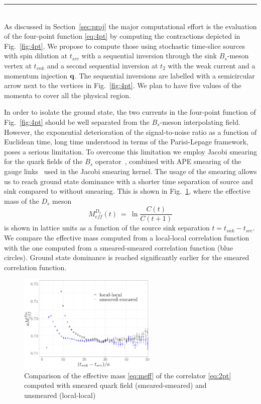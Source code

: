 \label{sec:algos}
\rule{\textwidth}{0.4pt}\\

As discussed in Section~\ref{sec:proj} the major computational effort is 
the evaluation of the four-point function \eqref{eq:4pt} by computing the
contractions depicted in Fig.~\ref{fig:4pt}.
We propose to compute those using stochastic time-slice sources with
spin dilution at $t_{src}$ with a sequential inversion through the
sink $B_s$-meson vertex at $t_{snk}$ and a second sequential inversion
at $t_2$ with the weak current and a momentum injection ${\bf q}$.
The sequential inversions are labelled with a semicircular arrow next to
the vertices in Fig.~\ref{fig:4pt}. We plan to have five values of the
momenta to cover all the physical region.

In order to isolate the ground state, the two currents in the
four-point function of Fig.~\ref{fig:4pt} should be well separated
from the $B_s$-meson interpolating field. However, the exponential
deterioration of the signal-to-noise ratio as a function of Euclidean
time, long time understood in terms of the Parisi-Lepage framework,
poses a serious limitation. To overcome this limitation we employ
Jacobi smearing for the quark fields of the $B_s$
operator~\cite{Allton:1993wc}, combined with APE smearing of the gauge
links~\cite{FALCIONI1985624} used in the Jacobi smearing kernel.  
The usage of the smearing allows us to reach ground state dominance 
with a shorter time separation of source and sink compared to without
smearing. This is shown in Fig.~\ref{fig:smearing}, where the
effective mass of the $D_s$ meson
\begin{equation}\label{eq:meff}
	M_{eff}^{D_s}(t)\ =\ \ln\frac{C(t)}{C(t+1)}	
\end{equation}
is shown in lattice units as a function of the source sink separation $t=t_{snk}-t_{src}$. We compare the effective mass
computed from a local-local correlation function with the one computed from
a smeared-smeared correlation function (blue circles). Ground state
dominance is reached significantly earlier for the smeared correlation
function. 
             
\begin{figure}
  \includegraphics[width=0.59\textwidth]{plots/smearing_MDs.pdf}
  \caption{Comparison of the effective mass \eqref{eq:meff} of the correlator
    \eqref{eq:2pt}  computed with
    smeared quark field (smeared-smeared) and unsmeared (local-local)} 
  \label{fig:smearing}
\end{figure}

